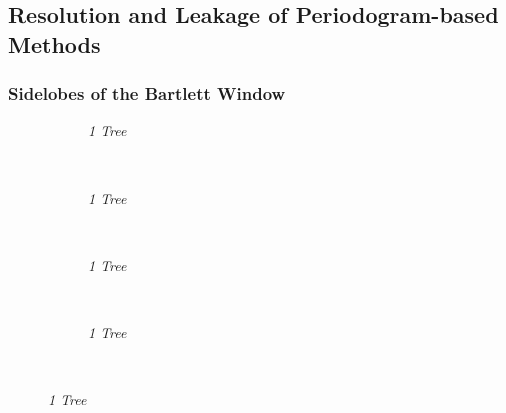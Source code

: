 \documentclass[./main.tex]{subfiles}
\begin{document}
	
\subsection{Resolution and Leakage of Periodogram-based Methods}

\subsubsection{Sidelobes of the Bartlett Window}

\begin{figure}[h]
	\centering
	\begin{subfigure}[b]{0.22\textwidth}
		\resizebox{\textwidth}{!}{}
		\caption{\textit{1 Tree}}
	\end{subfigure}
	~ %
	\begin{subfigure}[b]{0.22\textwidth}
		\resizebox{\textwidth}{!}{}
		\caption{\textit{1 Tree}}
	\end{subfigure}
	~ %
	\begin{subfigure}[b]{0.22\textwidth}
		\resizebox{\textwidth}{!}{}
		\caption{\textit{1 Tree}}
	\end{subfigure}
	~ %
	\begin{subfigure}[b]{0.22\textwidth}
		\resizebox{\textwidth}{!}{}
		\caption{\textit{1 Tree}}
	\end{subfigure}
	~ %
	~ %
\end{figure}

\begin{minipage}{.5\textwidth}
		\center
		\resizebox{\textwidth}{!}{}
		\label{fig:}
\end{minipage}
\begin{minipage}{.5\textwidth}
	\center
	\resizebox{\textwidth}{!}{}
	\label{fig:}
\end{minipage}

\end{document}
